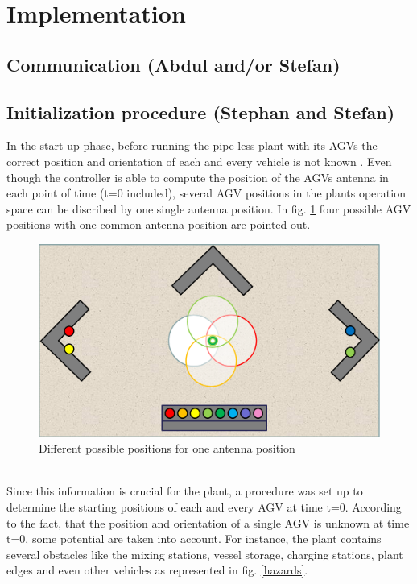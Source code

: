 \section{Implementation}\label{Sec_Imp}

\subsection{Communication (Abdul and/or Stefan)}

\subsection{Initialization procedure (Stephan and Stefan)}\label{Sec_Imp_Ini}
In the start-up phase, before running the pipe less plant with its AGVs the correct position and orientation of each and every vehicle is not known . Even though the controller is able to compute the position of the AGVs antenna in each point of time (t=0 included),  several AGV positions in the plants operation space can be discribed by one single antenna position. In fig. \ref{possible_initial_positions} four possible AGV positions with one common antenna position are pointed out. \\
\begin{figure}[!htbp]
\centering
\includegraphics[width = 16cm]{Pictures/possible_initial_positions}
\caption{Different possible positions for one antenna position}
\label{possible_initial_positions}
\end{figure}\\
Since this information is crucial for the plant, a procedure was set up to determine the starting positions of each and every AGV at time t=0.
According to the fact, that the position and orientation of a single AGV is unknown at time t=0, some potential are taken into account. For instance, the plant contains several obstacles like the mixing stations, vessel storage, charging stations, plant edges and even other vehicles as represented in fig. \ref{hazards}.\pagebreak
